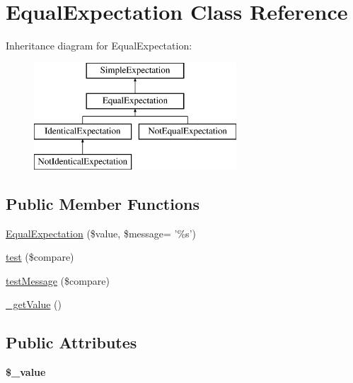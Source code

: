 \hypertarget{class_equal_expectation}{
\section{EqualExpectation Class Reference}
\label{class_equal_expectation}
}
Inheritance diagram for EqualExpectation:\begin{figure}[H]
\begin{center}
\leavevmode
\includegraphics[height=4.000000cm]{class_equal_expectation}
\end{center}
\end{figure}
\subsection*{Public Member Functions}
\begin{DoxyCompactItemize}
\item 
\hyperlink{class_equal_expectation_a13f738ba95ce51f758a18775a16e2e17}{EqualExpectation} (\$value, \$message= '\%s')
\item 
\hyperlink{class_equal_expectation_a412b216b1ba36e37d342aebb821ccb55}{test} (\$compare)
\item 
\hyperlink{class_equal_expectation_a707aa690ff9312ff1b99733d859f7f6f}{testMessage} (\$compare)
\item 
\hyperlink{class_equal_expectation_a60ce0cd029990b304408f0a73edfb93e}{\_\-getValue} ()
\end{DoxyCompactItemize}
\subsection*{Public Attributes}
\begin{DoxyCompactItemize}
\item 
\hypertarget{class_equal_expectation_a12891f9f993335f779d29e6fa2660592}{
{\bfseries \$\_\-value}}
\label{class_equal_expectation_a12891f9f993335f779d29e6fa2660592}

\end{DoxyCompactItemize}



